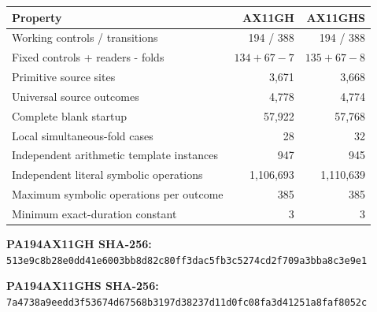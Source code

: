\begin{center}\small
\begin{tabular}{@{}lrr@{}}\toprule
Property&AX11GH&AX11GHS\\\midrule
Working controls / transitions & 194 / 388 & 194 / 388\\
Fixed controls + readers - folds & $134+67-7$ & $135+67-8$\\
Primitive source sites & 3,671 & 3,668\\
Universal source outcomes & 4,778 & 4,774\\
Complete blank startup & 57,922 & 57,768\\
Local simultaneous-fold cases & 28 & 32\\
Independent arithmetic template instances & 947 & 945\\
Independent literal symbolic operations & 1,106,693 & 1,110,639\\
Maximum symbolic operations per outcome & 385 & 385\\
Minimum exact-duration constant & 3 & 3\\
\bottomrule\end{tabular}\end{center}
\textbf{PA194AX11GH SHA-256:}\\
{\small\ttfamily\nolinkurl{513e9c8b28e0dd41e6003bb8d82c80ff3dac5fb3c5274cd2f709a3bba8c3e9e1}}\par
\textbf{PA194AX11GHS SHA-256:}\\
{\small\ttfamily\nolinkurl{7a4738a9eedd3f53674d67568b3197d38237d11d0fc08fa3d41251a8faf8052c}}\par
